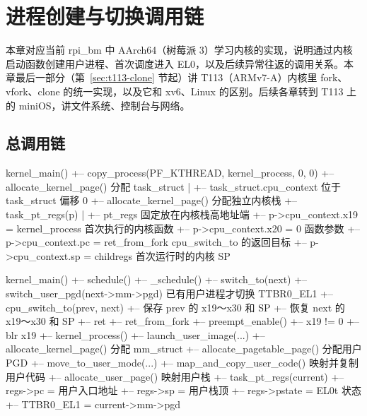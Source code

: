 \chapter{进程创建与切换调用链}
\label{chap:process}

本章对应当前 rpi\_bm 中 AArch64（树莓派 3）学习内核的实现，说明通过内核启动函数创建用户进程、首次调度进入 EL0，以及后续异常往返的调用关系。本章最后一部分（第~\ref{sec:t113-clone} 节起）讲 T113（ARMv7-A）内核里 fork、vfork、clone 的统一实现，以及它和 xv6、Linux 的区别。后续各章转到 T113 上的 miniOS，讲文件系统、控制台与网络。

\section{总调用链}

\begin{txtcode}[basicstyle=\ttfamily\scriptsize]
kernel_main()
+-- copy_process(PF_KTHREAD, kernel_process, 0, 0)
    +-- allocate_kernel_page()                  分配 task_struct
    |   +-- task_struct.cpu_context             位于 task_struct 偏移 0
    +-- allocate_kernel_page()                  分配独立内核栈
    +-- task_pt_regs(p)
    |   +-- pt_regs                             固定放在内核栈高地址端
    +-- p->cpu_context.x19 = kernel_process     首次执行的内核函数
    +-- p->cpu_context.x20 = 0                  函数参数
    +-- p->cpu_context.pc = ret_from_fork       cpu_switch_to 的返回目标
    +-- p->cpu_context.sp = childregs           首次运行时的内核 SP

kernel_main()
+-- schedule()
    +-- _schedule()
        +-- switch_to(next)
            +-- switch_user_pgd(next->mm->pgd)  已有用户进程才切换 TTBR0_EL1
            +-- cpu_switch_to(prev, next)
                +-- 保存 prev 的 x19～x30 和 SP
                +-- 恢复 next 的 x19～x30 和 SP
                +-- ret
                    +-- ret_from_fork
                        +-- preempt_enable()
                        +-- x19 != 0
                        +-- blr x19
                            +-- kernel_process()
                                +-- launch_user_image(...)
                                    +-- allocate_kernel_page()          分配 mm_struct
                                    +-- allocate_pagetable_page()       分配用户 PGD
                                    +-- move_to_user_mode(...)
                                        +-- map_and_copy_user_code()    映射并复制用户代码
                                        +-- allocate_user_page()        映射用户栈
                                        +-- task_pt_regs(current)
                                        +-- regs->pc = 用户入口地址
                                        +-- regs->sp = 用户栈顶
                                        +-- regs->pstate = EL0t 状态
                                        +-- TTBR0_EL1 = current->mm->pgd


\end{txtcode}

